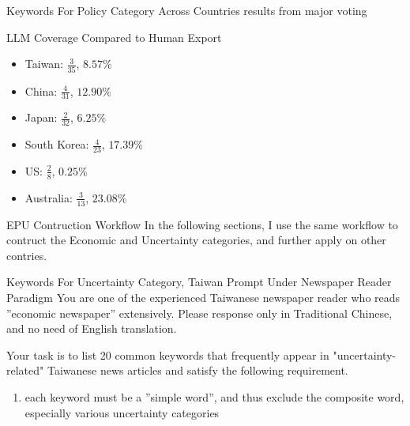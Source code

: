 \documentclass[12pt]{beamer}
\begin{document}
\begin{frame}{Keywords For Policy Category Across Countries}
    {results from major voting}
\begin{table}[H]
\renewcommand\arraystretch{1.0}
\label{Taiwan policy keywords}
\begin{adjustwidth}{-0.0cm}{}
\begin{center}
\setlength{\tabcolsep}{6pt}
{
    \fontsize{8}{8} \selectfont
    
}
\end{center}
\end{adjustwidth}
\end{table}
\end{frame}


\begin{frame}{LLM Coverage Compared to Human Export}
    \begin{itemize}
        \item Taiwan: $\frac{3}{35}$, $8.57\%$
        \item China: $\frac{4}{31}$, $12.90\%$
        \item Japan: $\frac{2}{32}$, $6.25\%$
        \item South Korea: $\frac{4}{23}$, $17.39\%$
        \item US: $\frac{2}{8}$, $0.25\%$
        \item Australia: $\frac{3}{13}$, $23.08\%$
    \end{itemize}
\end{frame}

\begin{frame}{EPU Contruction Workflow}
In the following sections, I use the same workflow to contruct the Economic and
Uncertainty categories, and further apply on other contries.
\end{frame}


\begin{frame}{Keywords For Uncertainty Category, Taiwan}
    {Prompt Under Newspaper Reader Paradigm}
You are one of the experienced Taiwanese newspaper reader who reads ”economic
newspaper” extensively. Please response only in Traditional Chinese, and no
need of English translation. \newline

Your task is to list 20 common keywords that frequently appear in
"uncertainty-related" Taiwanese news articles and satisfy the following
requirement.
\begin{enumerate}
    \item each keyword must be a ”simple word”, and thus exclude the composite word,
        especially various uncertainty categories
\end{enumerate}
\end{frame}
\end{document}
